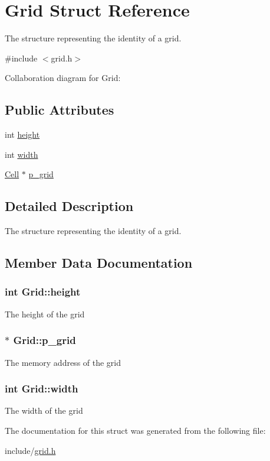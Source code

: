 \hypertarget{structGrid}{\section{Grid Struct Reference}
\label{structGrid}
}


The structure representing the identity of a grid.  




{\ttfamily \#include $<$grid.\-h$>$}



Collaboration diagram for Grid\-:
\subsection*{Public Attributes}
\begin{DoxyCompactItemize}
\item 
int \hyperlink{structGrid_a76a5d361e4b78aa63fb50689d99dbba7}{height}
\item 
int \hyperlink{structGrid_a811c4e2e31bacb9b811aaaf105aeca00}{width}
\item 
\hyperlink{structCell}{Cell} $\ast$ \hyperlink{structGrid_a02b8e640790b0fde9bcbac0ae8620d64}{p\-\_\-grid}
\end{DoxyCompactItemize}


\subsection{Detailed Description}
The structure representing the identity of a grid. 

\subsection{Member Data Documentation}
\hypertarget{structGrid_a76a5d361e4b78aa63fb50689d99dbba7}{
\subsubsection[{height}]{\setlength{\rightskip}{0pt plus 5cm}int Grid\-::height}}\label{structGrid_a76a5d361e4b78aa63fb50689d99dbba7}
The height of the grid \hypertarget{structGrid_a02b8e640790b0fde9bcbac0ae8620d64}{
\subsubsection[{p\-\_\-grid}]{$\ast$ Grid\-::p\-\_\-grid}}\label{structGrid_a02b8e640790b0fde9bcbac0ae8620d64}
The memory address of the grid \hypertarget{structGrid_a811c4e2e31bacb9b811aaaf105aeca00}{
\subsubsection[{width}]{\setlength{\rightskip}{0pt plus 5cm}int Grid\-::width}}\label{structGrid_a811c4e2e31bacb9b811aaaf105aeca00}
The width of the grid 

The documentation for this struct was generated from the following file\-:\begin{DoxyCompactItemize}
\item 
include/\hyperlink{grid_8h}{grid.\-h}\end{DoxyCompactItemize}
